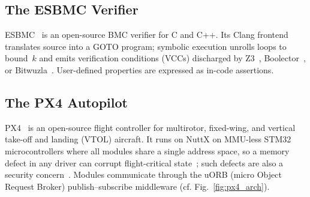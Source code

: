 \documentclass[conference]{IEEEtran}
\newcommand{\entra}[1]{#1}
\begin{document}
\subsection{The ESBMC Verifier}
\label{subsec:esbmc}

ESBMC~\cite{Cordeiro2012,Monteiro2022,Menezes2024} is an open-source BMC verifier
for C and C++.
Its Clang frontend translates source into a GOTO program;
symbolic execution unrolls loops to bound~$k$ and emits \entra{verification conditions (VCCs)}
discharged by Z3~\cite{deMoura2008}, Boolector~\cite{Brummayer2009},
or Bitwuzla~\cite{Niemetz2023}.
User-defined properties are expressed as in-code assertions.

\subsection{The PX4 Autopilot}
\label{subsec:px4}

PX4~\cite{PX4_GitHub,PX4_Documentation} is an open-source flight
controller for multirotor, fixed-wing, and \entra{vertical take-off and
landing (VTOL)} aircraft.
It runs on NuttX on MMU-less STM32 microcontrollers where all modules
share a single address space, so a memory defect in any driver can
corrupt flight-critical state~\cite{PX4_Documentation}; such defects are also a security concern~\cite{Siddiqi2022}.
Modules communicate through the uORB \entra{(micro Object Request Broker)}
publish--subscribe middleware
(cf. Fig.~\ref{fig:px4_arch}).
\end{document}
